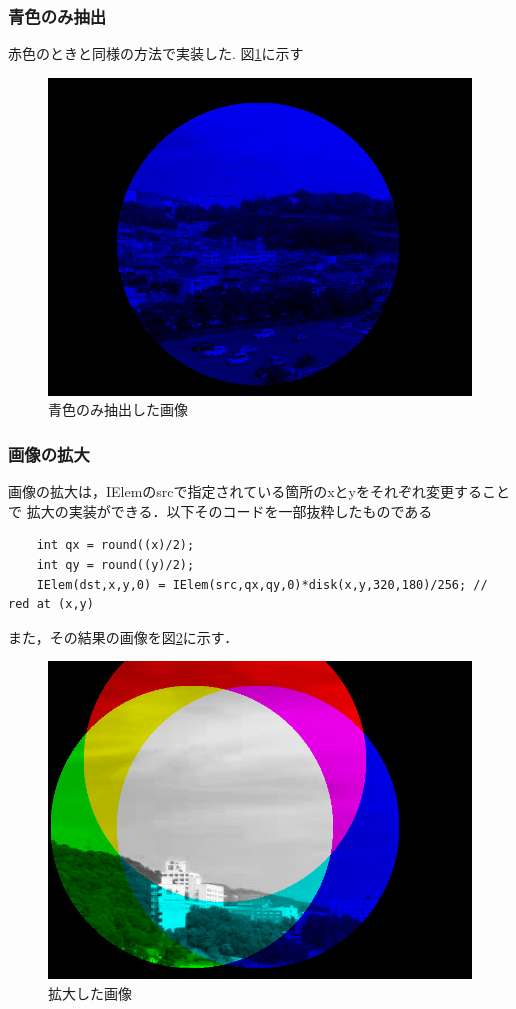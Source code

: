 \documentclass[11pt]{jarticle}
\begin{document}
\subsubsection{青色のみ抽出}
赤色のときと同様の方法で実装した.
図\ref{1-8.jpg}に示す

\begin{figure}[htbp]
    \centering
    \includegraphics[scale=.2]{1-8.jpg}
    \caption{青色のみ抽出した画像}
    \label{1-8.jpg}
\end{figure}

\subsubsection{画像の拡大}
画像の拡大は，IElemのsrcで指定されている箇所のxとyをそれぞれ変更することで
拡大の実装ができる．以下そのコードを一部抜粋したものである
\begin{verbatim}
    int qx = round((x)/2);
    int qy = round((y)/2); 
    IElem(dst,x,y,0) = IElem(src,qx,qy,0)*disk(x,y,320,180)/256; // red at (x,y)
\end{verbatim}
また，その結果の画像を図\ref{1-9.jpg}に示す．
\begin{figure}[htbp]
    \centering
    \includegraphics[scale=.2]{1-9.jpg}
    \caption{拡大した画像}
    \label{1-9.jpg}
\end{figure}
\end{document}

